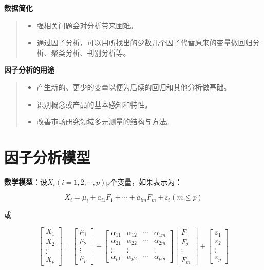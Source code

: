 \documentclass[]{ctexbook}
\providecommand{\tightlist}{%
  \setlength{\itemsep}{0pt}\setlength{\parskip}{0pt}}
\begin{document}
\textbf{数据简化}

\begin{quote}
\begin{itemize}
\tightlist
\item
  强相关问题会对分析带来困难。
\item
  通过因子分析，可以用所找出的少数几个因子代替原来的变量做回归分析、聚类分析、判别分析等。
\end{itemize}
\end{quote}

\textbf{因子分析的用途}

\begin{quote}
\begin{itemize}
\tightlist
\item
  产生新的、更少的变量以便为后续的回归和其他分析做基础。
\item
  识别概念或产品的基本感知和特性。
\item
  改善市场研究领域多元测量的结构与方法。
\end{itemize}
\end{quote}

\hypertarget{ux56e0ux5b50ux5206ux6790ux6a21ux578b}{%
\section{因子分析模型}\label{ux56e0ux5b50ux5206ux6790ux6a21ux578b}}

\textbf{数学模型}：设\(X_i(i=1,2,\cdots,p)\)p个变量，如果表示为：

\[X_i=\mu_i+a_{i1}F_1+\cdots+a_{im}F_m+\varepsilon_i(m\le p)\]

或

\[\begin {bmatrix} X_1\\X_2\\\vdots\\X_p  \end {bmatrix}=\begin {bmatrix} \mu_1\\\mu_2\\\vdots\\\mu_p  \end {bmatrix}+\begin {bmatrix} \alpha_{11}&\alpha_{12}&\cdots&\alpha_{1m}\\\alpha_{21}&\alpha_{22}&\cdots&\alpha_{2m}\\\vdots&\vdots&&\vdots\\\alpha_{p1}&\alpha_{p2}&\cdots&\alpha_{pm} \end {bmatrix}\begin {bmatrix} F_1\\F_2\\\vdots\\F_m  \end {bmatrix}+\begin{bmatrix} \varepsilon_1\\ \varepsilon_2\\\vdots\\ \varepsilon_p  \end {bmatrix}\]
\end{document}
